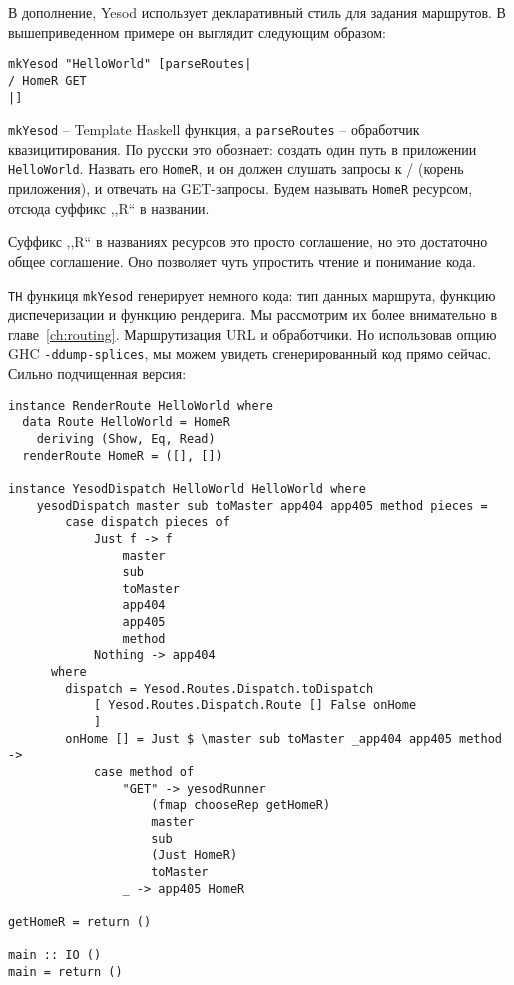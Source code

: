 В дополнение, Yesod использует декларативный стиль для задания маршрутов. 
В вышеприведенном примере он выглядит следующим образом:

\begin{lstlisting}
mkYesod "HelloWorld" [parseRoutes|
/ HomeR GET
|]
\end{lstlisting}

\lstinline!mkYesod! -- Template Haskell функция, а \lstinline!parseRoutes! -- 
обработчик квазицитирования. По русски это обознает: создать один 
путь в приложении \texttt{HelloWorld}. Назвать его \lstinline!HomeR!, и он 
должен слушать запросы к / (корень приложения), и отвечать на GET-запросы.
Будем называть \lstinline!HomeR! ресурсом, отсюда суффикс ,,R`` в названии.

Суффикс ,,R`` в названиях ресурсов это просто соглашение, 
но это достаточно общее соглашение. Оно позволяет чуть упростить чтение и 
понимание кода.

\texttt{TH} функиця \lstinline!mkYesod! генерирует немного кода: 
тип данных маршрута, функцию диспечеризации и функцию рендерига. 
Мы рассмотрим их более внимательно в главе~\ref{ch:routing}. 
Маршрутизация URL и обработчики.
Но использовав опцию GHC \lstinline'-ddump-splices', мы можем увидеть 
сгенерированный код прямо сейчас. Сильно подчищенная версия: 

\begin{lstlisting}
instance RenderRoute HelloWorld where
  data Route HelloWorld = HomeR
    deriving (Show, Eq, Read)
  renderRoute HomeR = ([], [])

instance YesodDispatch HelloWorld HelloWorld where
    yesodDispatch master sub toMaster app404 app405 method pieces =
        case dispatch pieces of
            Just f -> f
                master
                sub
                toMaster
                app404
                app405
                method
            Nothing -> app404
      where
        dispatch = Yesod.Routes.Dispatch.toDispatch
            [ Yesod.Routes.Dispatch.Route [] False onHome
            ]
        onHome [] = Just $ \master sub toMaster _app404 app405 method ->
            case method of
                "GET" -> yesodRunner
                    (fmap chooseRep getHomeR)
                    master
                    sub
                    (Just HomeR)
                    toMaster
                _ -> app405 HomeR

getHomeR = return ()

main :: IO ()
main = return ()
\end{lstlisting}

